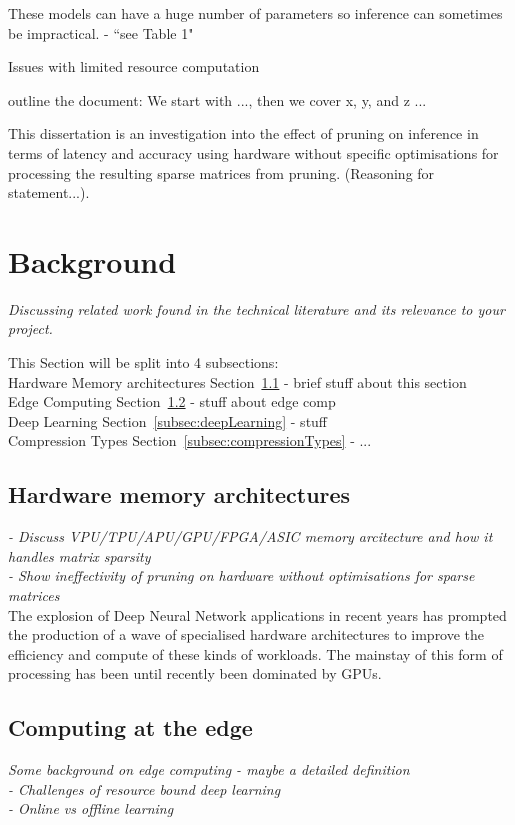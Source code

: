 \documentclass[11pt]{article}
\begin{document}
These models can have a huge number of parameters so inference can sometimes be impractical.
\autocite{chenDeepLearningMobile2020} - ``see Table 1"

Issues with limited resource computation \autocite{szeEfficientProcessingDeep2017}

outline the document: We start with ..., then we cover x, y, and z ...

This dissertation is an investigation into the effect of pruning on inference in terms of latency and accuracy using 
hardware without specific optimisations for processing the resulting sparse matrices from pruning. (Reasoning for statement...). 

\pagebreak
\section{Background}
\emph{Discussing related work found in the technical literature and its relevance to your
project.}

This Section will be split into 4 subsections:\\
Hardware Memory architectures Section~\ref{subsec:hardwareArch} - brief stuff about this section\\
Edge Computing Section~\ref{subsec:edgeComputing} - stuff about edge comp\\
Deep Learning Section~\ref{subsec:deepLearning} - stuff\\
Compression Types Section~\ref{subsec:compressionTypes} - ...\\


\subsection{Hardware memory architectures}\label{subsec:hardwareArch}
\emph{
- Discuss VPU/TPU/APU/GPU/FPGA/ASIC memory arcitecture and how it handles matrix sparsity\\
- Show ineffectivity of pruning on hardware without optimisations for sparse matrices\\
}
The explosion of Deep Neural Network applications in recent years has prompted the production of a wave of specialised hardware architectures to improve the efficiency and compute of these kinds of workloads. The mainstay of this form of processing has been until recently been dominated by GPUs.\\

\subsection{Computing at the edge}\label{subsec:edgeComputing}
\emph{Some background on edge computing - maybe a detailed definition\\
 - Challenges of resource bound deep learning\\
 - Online vs offline learning\\}
\end{document}
